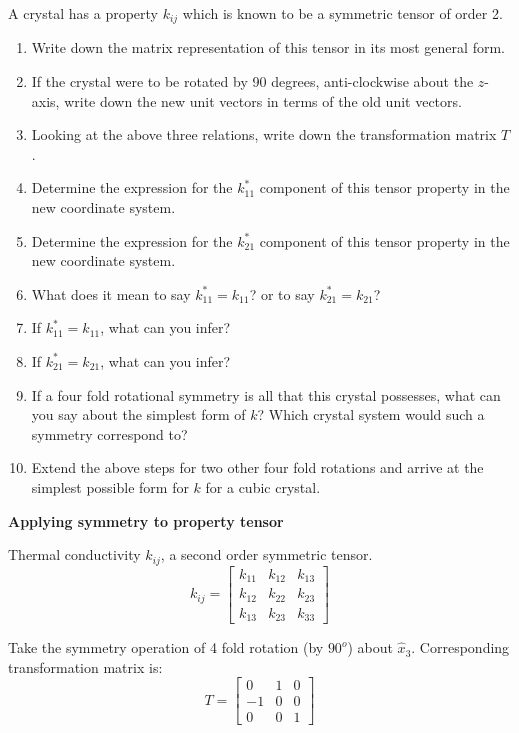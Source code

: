 \begin{mdframed}[style=tpscaffold1]
A crystal has a property $k_{ij}$ which is known to be a symmetric tensor of order 2. 

\begin{enumerate}
\item Write down the matrix representation of this tensor in its most general form.
\item If the crystal were to be rotated by 90 degrees, anti-clockwise about the $z$-axis, write down the new unit vectors in terms of the old unit vectors.
\item Looking at the above three relations, write down the transformation matrix $T$.
\item Determine the expression for the $k^*_{11}$ component of this tensor property in the new coordinate system.
\item Determine the expression for the $k^*_{21}$ component of this tensor property in the new coordinate system.
\item What does it mean to say $k^*_{11} = k_{11}$? or to say $k^*_{21} = k_{21}$?
\item If $k^*_{11} = k_{11}$, what can you infer?
\item If $k^*_{21} = k_{21}$, what can you infer?
\item If a four fold rotational symmetry is all that this crystal possesses, what can you say about the simplest form of $k$? Which crystal system would such a symmetry correspond to?
\item Extend the above steps for two other four fold rotations and arrive at the simplest possible form for $k$ for a cubic crystal.
\end{enumerate}
\end{mdframed}

{\bf Applying symmetry to property tensor}

Thermal conductivity $k_{ij}$, a second order symmetric tensor.
\begin{equation*}
k_{ij} = \left[
\begin{array}{lll}
k_{11} & k_{12} & k_{13} \\
k_{12} & k_{22} & k_{23} \\
k_{13} & k_{23} & k_{33}
\end{array}
\right]
\end{equation*}

Take the symmetry operation of 4 fold rotation (by $90^o$) about $\hat{x}_3$. Corresponding transformation matrix is:
\begin{equation*}
T = \left[
\begin{array}{lll}
0 & 1 & 0 \\
-1 & 0 & 0 \\
0 & 0 & 1
\end{array}
\right] 
\end{equation*}


